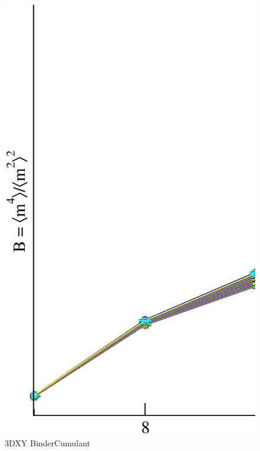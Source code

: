 \begin{figure}[!htpb]
  \centering
  \includegraphics[width=\textwidth]{./plots/3DXY/vsL/BinderCumulant.eps}
  \caption{3DXY BinderCumulant}
\end{figure}

